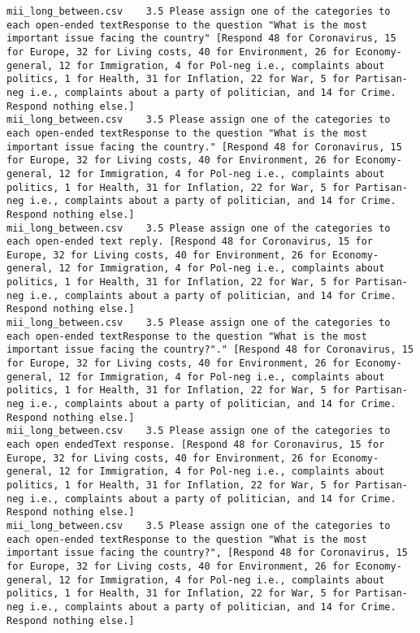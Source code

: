 \begin{lstlisting}[label=lst:promptvariants]
mii_long_between.csv	3.5	Please assign one of the categories to each open-ended textResponse to the question "What is the most important issue facing the country" [Respond 48 for Coronavirus, 15 for Europe, 32 for Living costs, 40 for Environment, 26 for Economy-general, 12 for Immigration, 4 for Pol-neg i.e., complaints about politics, 1 for Health, 31 for Inflation, 22 for War, 5 for Partisan-neg i.e., complaints about a party of politician, and 14 for Crime. Respond nothing else.]
mii_long_between.csv	3.5	Please assign one of the categories to each open-ended textResponse to the question "What is the most important issue facing the country." [Respond 48 for Coronavirus, 15 for Europe, 32 for Living costs, 40 for Environment, 26 for Economy-general, 12 for Immigration, 4 for Pol-neg i.e., complaints about politics, 1 for Health, 31 for Inflation, 22 for War, 5 for Partisan-neg i.e., complaints about a party of politician, and 14 for Crime. Respond nothing else.]
mii_long_between.csv	3.5	Please assign one of the categories to each open-ended text reply. [Respond 48 for Coronavirus, 15 for Europe, 32 for Living costs, 40 for Environment, 26 for Economy-general, 12 for Immigration, 4 for Pol-neg i.e., complaints about politics, 1 for Health, 31 for Inflation, 22 for War, 5 for Partisan-neg i.e., complaints about a party of politician, and 14 for Crime. Respond nothing else.]
mii_long_between.csv	3.5	Please assign one of the categories to each open-ended textResponse to the question "What is the most important issue facing the country?"." [Respond 48 for Coronavirus, 15 for Europe, 32 for Living costs, 40 for Environment, 26 for Economy-general, 12 for Immigration, 4 for Pol-neg i.e., complaints about politics, 1 for Health, 31 for Inflation, 22 for War, 5 for Partisan-neg i.e., complaints about a party of politician, and 14 for Crime. Respond nothing else.]
mii_long_between.csv	3.5	Please assign one of the categories to each open endedText response. [Respond 48 for Coronavirus, 15 for Europe, 32 for Living costs, 40 for Environment, 26 for Economy-general, 12 for Immigration, 4 for Pol-neg i.e., complaints about politics, 1 for Health, 31 for Inflation, 22 for War, 5 for Partisan-neg i.e., complaints about a party of politician, and 14 for Crime. Respond nothing else.]
mii_long_between.csv	3.5	Please assign one of the categories to each open-ended textResponse to the question "What is the most important issue facing the country?", [Respond 48 for Coronavirus, 15 for Europe, 32 for Living costs, 40 for Environment, 26 for Economy-general, 12 for Immigration, 4 for Pol-neg i.e., complaints about politics, 1 for Health, 31 for Inflation, 22 for War, 5 for Partisan-neg i.e., complaints about a party of politician, and 14 for Crime. Respond nothing else.]

\end{lstlisting}
